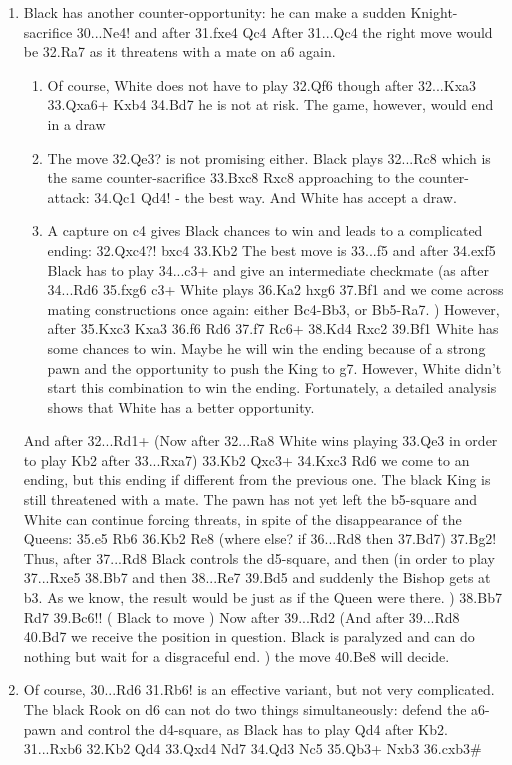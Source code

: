 \documentclass[
	11pt,twocolumn]{article}
\begin{document}
\begin{enumerate}
\item
Black has another counter-opportunity: he can make a sudden Knight-sacrifice 30...Ne4!  and after 31.fxe4 Qc4  After 31...Qc4 the right move would be 32.Ra7  as it threatens with a mate on a6 again. 

\begin{enumerate}
\item
Of course, White does not have to play 32.Qf6  though after 32...Kxa3 33.Qxa6+ Kxb4 34.Bd7 he is not at risk. The game, however, would end in a draw 

\item
The move 32.Qe3?  is not promising either. Black plays 32...Rc8  which is the same counter-sacrifice 33.Bxc8 Rxc8  approaching to the counter-attack: 34.Qc1 Qd4! - the best way. And White has accept a draw. 

\item
A capture on c4 gives Black chances to win and leads to a complicated ending: 32.Qxc4?! bxc4 33.Kb2  The best move is 33...f5  and after 34.exf5  Black has to play 34...c3+  and give an intermediate checkmate (as after 34...Rd6 35.fxg6 c3+  White plays 36.Ka2 hxg6 37.Bf1 and we come across mating constructions once again: either Bc4-Bb3, or Bb5-Ra7. ) However, after 35.Kxc3 Kxa3 36.f6 Rd6 37.f7 Rc6+ 38.Kd4 Rxc2 39.Bf1 White has some chances to win. Maybe he will win the ending because of a strong pawn and the opportunity to push the King to g7. However, White didn't start this combination to win the ending. Fortunately, a detailed analysis shows that White has a better opportunity. 
\end{enumerate}

And after 32...Rd1+ (Now after 32...Ra8  White wins playing 33.Qe3  in order to play Kb2 after 33...Rxa7) 33.Kb2 Qxc3+ 34.Kxc3 Rd6  we come to an ending, but this ending if different from the previous one. The black King is still threatened with a mate. The pawn has not yet left the b5-square and White can continue forcing threats, in spite of the disappearance of the Queens: 35.e5 Rb6 36.Kb2 Re8 (where else? if 36...Rd8  then 37.Bd7) 37.Bg2!  Thus, after 37...Rd8  Black controls the d5-square, and then (in order to play 37...Rxe5 38.Bb7  and then 38...Re7 39.Bd5 and suddenly the Bishop gets at b3. As we know, the result would be just as if the Queen were there. ) 38.Bb7 Rd7 39.Bc6!!  ( Black to move ) Now after 39...Rd2 (And after 39...Rd8 40.Bd7 we receive the position in question. Black is paralyzed and can do nothing but wait for a disgraceful end. ) the move 40.Be8 will decide. 

\item
Of course, 30...Rd6 31.Rb6!  is an effective variant, but not very complicated. The black Rook on d6 can not do two things simultaneously: defend the a6-pawn and control the d4-square, as Black has to play Qd4 after Kb2. 31...Rxb6 32.Kb2 Qd4 33.Qxd4 Nd7 34.Qd3 Nc5 35.Qb3+ Nxb3 36.cxb3\#
\end{enumerate}
\end{document}
